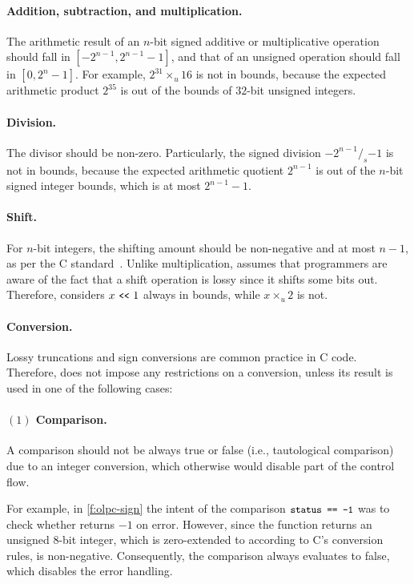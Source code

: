 \paragraph{Addition, subtraction, and multiplication.}
The arithmetic result of an $n$-bit signed additive or multiplicative
operation should fall in $[-2^{n-1}, 2^{n-1}-1]$,
and that of an unsigned operation should fall in
$[0, 2^{n}-1]$.
For example,
$2^{31}\times_u 16$ is not in bounds,
because the expected arithmetic product $2^{35}$ is out of the bounds
of $32$-bit unsigned integers.

\paragraph{Division.}
The divisor should be non-zero.  Particularly, the signed division
$-2^{n-1} /_s {-1}$ is not in bounds, because the expected arithmetic
quotient $2^{n-1}$ is out of the $n$-bit signed integer bounds,
which is at most $2^{n-1}-1$.

\paragraph{Shift.}
For $n$-bit integers, the shifting amount should be non-negative
and at most $n-1$, as per the C standard~\cite[6.5.7]{c11}.
%
Unlike multiplication, \sys assumes that programmers are aware of
the fact that a shift operation is lossy since it shifts some bits
out.  Therefore, \sys considers $x \shl 1$ always in bounds, while
$x \times_u 2$ is not.

\paragraph{Conversion.}
Lossy truncations and sign conversions are common practice in
C code.  Therefore,
\sys does not impose any restrictions on a conversion,
unless its result is used in one of the following cases:

\paragraph{$(1)$ Comparison.}
A comparison should not be always true or false (i.e., tautological
comparison) due to an integer conversion, which otherwise would
disable part of the control flow.

For example, in \autoref{f:olpc-sign} the intent of the comparison
$\cc{status == -1}$ was to check whether  returns
${-1}$ on error.  However, since the function returns an unsigned 8-bit
integer, which is zero-extended to  according to C's
conversion rules,  is non-negative.  Consequently,
the comparison always evaluates to false, which disables the error
handling.

